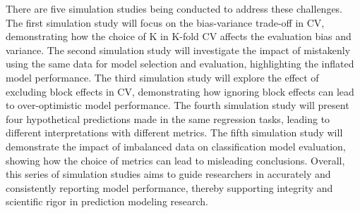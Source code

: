 There are five simulation studies being conducted to address these challenges. The first simulation study will focus on the bias-variance trade-off in CV, demonstrating how the choice of K in K-fold CV affects the evaluation bias and variance. The second simulation study will investigate the impact of mistakenly using the same data for model selection and evaluation, highlighting the inflated model performance. The third simulation study will explore the effect of excluding block effects in CV, demonstrating how ignoring block effects can lead to over-optimistic model performance. The fourth simulation study will present four hypothetical predictions made in the same regression tasks, leading to different interpretations with different metrics. The fifth simulation study will demonstrate the impact of imbalanced data on classification model evaluation, showing how the choice of metrics can lead to misleading conclusions. Overall, this series of simulation studies aims to guide researchers in accurately and consistently reporting model performance, thereby supporting integrity and scientific rigor in prediction modeling research.
